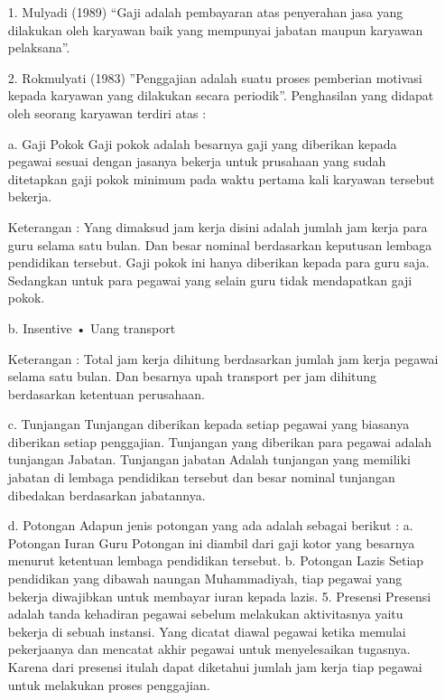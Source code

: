\documentclass{jtetiproposalskripsi}
\begin{document}
\begin{itemize}
\item[1.] Mulyadi (1989)
“Gaji adalah pembayaran atas penyerahan jasa yang dilakukan 	oleh karyawan baik yang mempunyai jabatan  maupun karyawan  pelaksana”.
\item[2.] Rokmulyati (1983)
”Penggajian adalah suatu proses pemberian motivasi kepada karyawan yang dilakukan secara periodik”.
	Penghasilan yang didapat oleh seorang karyawan terdiri atas :

\item[a.] Gaji Pokok
Gaji pokok adalah besarnya gaji yang diberikan kepada pegawai sesuai dengan jasanya bekerja untuk prusahaan yang sudah ditetapkan gaji pokok minimum pada waktu pertama kali karyawan tersebut bekerja.
 
Keterangan :
Yang dimaksud jam kerja disini adalah jumlah jam kerja para guru selama satu bulan. Dan besar nominal berdasarkan keputusan lembaga pendidikan tersebut.
Gaji pokok ini hanya diberikan kepada para guru saja. Sedangkan untuk para pegawai yang selain guru tidak mendapatkan gaji pokok.

\item[b.] Insentive
•	Uang transport
 
Keterangan :
Total jam kerja dihitung berdasarkan jumlah jam kerja pegawai selama satu  bulan. Dan besarnya upah transport per jam dihitung berdasarkan ketentuan perusahaan.

\item[c.] Tunjangan
		Tunjangan diberikan kepada setiap pegawai yang biasanya diberikan setiap penggajian. Tunjangan yang diberikan para pegawai adalah tunjangan Jabatan.
		Tunjangan jabatan Adalah tunjangan yang memiliki jabatan di lembaga pendidikan tersebut dan besar nominal tunjangan dibedakan berdasarkan jabatannya.

\item[d.]	Potongan
Adapun jenis potongan yang ada  adalah sebagai berikut :
a.	Potongan Iuran Guru
Potongan ini diambil dari gaji kotor yang besarnya menurut ketentuan lembaga pendidikan tersebut.
b.	Potongan Lazis
Setiap pendidikan yang dibawah naungan Muhammadiyah, tiap pegawai yang bekerja diwajibkan untuk membayar iuran kepada lazis. 
5.	Presensi
Presensi adalah tanda kehadiran pegawai sebelum melakukan aktivitasnya yaitu bekerja di sebuah instansi. Yang dicatat diawal pegawai ketika memulai pekerjaanya dan mencatat akhir pegawai untuk menyelesaikan tugasnya. Karena dari presensi itulah dapat diketahui jumlah jam kerja tiap pegawai untuk melakukan proses penggajian.


\end{itemize}
\end{document}
